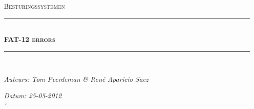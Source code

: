 \documentclass[11pt]{article}
\newcommand{\HRule}{\rule{\linewidth}{0.5mm}}
\begin{document}
	\begin{titlepage}
	\begin{center}
		\textsc{\Large Besturingssystemen}\\[0.5cm]
		\HRule \\[0,4cm]
		\textsc{\huge \bfseries FAT-12 errors}
		\HRule \\[2cm]
		\begin{minipage}{0.4\textwidth}
			\begin{flushleft}\large
				\emph{Auteurs: Tom Peerdeman \& Ren\'e Aparicio Saez}\\
			\end{flushleft}
		\end{minipage}
		\begin{minipage}{0.4\textwidth}
			\begin{flushright}\large
			\emph{Datum: 25-05-2012\\\'}\\
			\end{flushright}
		\end{minipage}
	\end{center}
	\end{titlepage}
\end{document}
